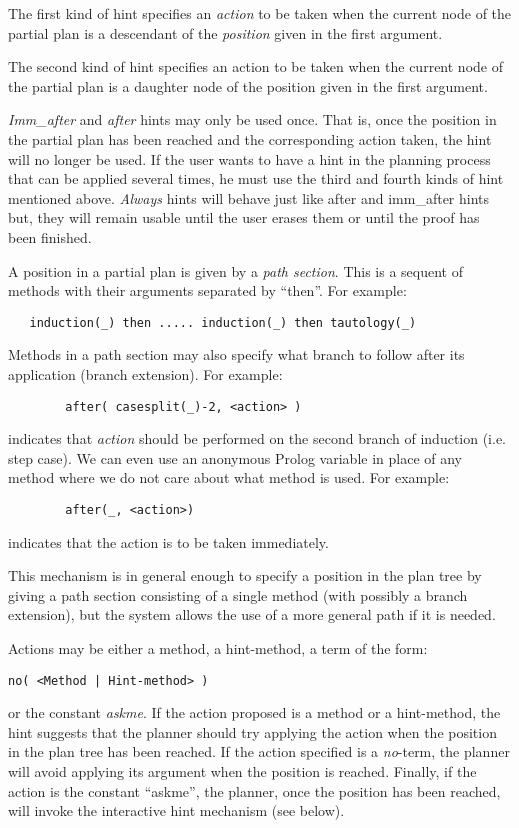         The first kind of hint specifies an {\em action} to be taken
when the current node of the partial plan is a descendant of the {\em
position} given in the first argument.

        The second kind of hint specifies an action to be taken when the
current node of the partial plan is a daughter node of the position
given in the first argument.

        {\em Imm\_after} and {\em after} hints may only be used once. 
That is, once the position in the partial plan has been reached and the
corresponding action taken, the hint will no longer be used.  If the
user wants to have a hint in the planning process that can be applied
several times, he must use the third and fourth kinds of hint mentioned
above.  {\em Always} hints will behave just like after and imm\_after
hints but, they will remain usable until the user erases them or until
the proof has been finished. 

        A position in a partial plan is given by a {\em path section}.
This is a sequent of methods with their arguments separated by ``then''.
For example:
\begin{verbatim}
   induction(_) then ..... induction(_) then tautology(_)
\end{verbatim}

        Methods in a path section may also specify what branch to follow
after its application (branch extension). For example: 

\begin{verbatim}
        after( casesplit(_)-2, <action> )
\end{verbatim}

indicates that {\em action} should be performed on the second branch of
induction (i.e. step case). We can even use an anonymous Prolog variable in
place of any method where we do not care about what method is used. For
example:

\begin{verbatim}
        after(_, <action>)
\end{verbatim}

indicates that the action is to be taken immediately.

        This mechanism is in general enough to specify a position in
the plan tree by giving a path section consisting of a single method
(with possibly a branch extension), but the system allows the use of a
more general path if it is needed.


        Actions may be either a method, a hint-method, a term of the
form: 
\begin{verbatim}
no( <Method | Hint-method> )
\end{verbatim}
 or the constant {\em askme}. If the action proposed is a method or a
hint-method, the hint suggests that the planner should try applying the
action when the position in the plan tree has been reached. If the
action specified is a {\em no}-term, the planner will avoid applying
its argument when the position is reached. Finally, if the action is
the constant ``askme'', the planner, once the position has been
reached, will invoke the interactive hint mechanism (see below).

